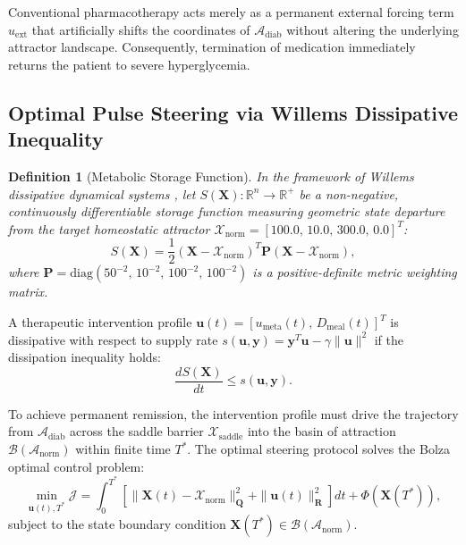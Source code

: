 \documentclass[11pt,a4paper]{article}
\newtheorem{definition}[theorem]{Definition}
\begin{document}
Conventional pharmacotherapy acts merely as a permanent external forcing term $u_{\mathrm{ext}}$ that artificially shifts the coordinates of $\mathcal{A}_{\mathrm{diab}}$ without altering the underlying attractor landscape. Consequently, termination of medication immediately returns the patient to severe hyperglycemia.

\subsection{Optimal Pulse Steering via Willems Dissipative Inequality}

\begin{definition}[Metabolic Storage Function]
In the framework of Willems dissipative dynamical systems \cite{Willems1972}, let $S(\bm{X}): \mathbb{R}^n \to \mathbb{R}^+$ be a non-negative, continuously differentiable storage function measuring geometric state departure from the target homeostatic attractor $\mathcal{X}_{\mathrm{norm}} = [100.0, \, 10.0, \, 300.0, \, 0.0]^T$:
\begin{equation}
S(\bm{X}) = \frac{1}{2} (\bm{X} - \mathcal{X}_{\mathrm{norm}})^T \bm{P} (\bm{X} - \mathcal{X}_{\mathrm{norm}}),
\end{equation}
where $\bm{P} = \mathrm{diag}\left( 50^{-2}, \, 10^{-2}, \, 100^{-2}, \, 100^{-2} \right)$ is a positive-definite metric weighting matrix.
\end{definition}

A therapeutic intervention profile $\bm{u}(t) = [u_{\mathrm{meta}}(t), \, D_{\mathrm{meal}}(t)]^T$ is dissipative with respect to supply rate $s(\bm{u}, \bm{y}) = \bm{y}^T \bm{u} - \gamma \|\bm{u}\|^2$ if the dissipation inequality holds:
\begin{equation}
\frac{dS(\bm{X})}{dt} \le s(\bm{u}, \bm{y}).
\end{equation}

To achieve permanent remission, the intervention profile must drive the trajectory from $\mathcal{A}_{\mathrm{diab}}$ across the saddle barrier $\mathcal{X}_{\mathrm{saddle}}$ into the basin of attraction $\mathcal{B}(\mathcal{A}_{\mathrm{norm}})$ within finite time $T^*$. The optimal steering protocol solves the Bolza optimal control problem:
\begin{equation}
\min_{\bm{u}(t), T^*} \mathcal{J} = \int_0^{T^*} \left[ \|\bm{X}(t) - \mathcal{X}_{\mathrm{norm}}\|_{\bm{Q}}^2 + \|\bm{u}(t)\|_{\bm{R}}^2 \right] dt + \Phi(\bm{X}(T^*)),
\end{equation}
subject to the state boundary condition $\bm{X}(T^*) \in \mathcal{B}(\mathcal{A}_{\mathrm{norm}})$.
\end{document}
